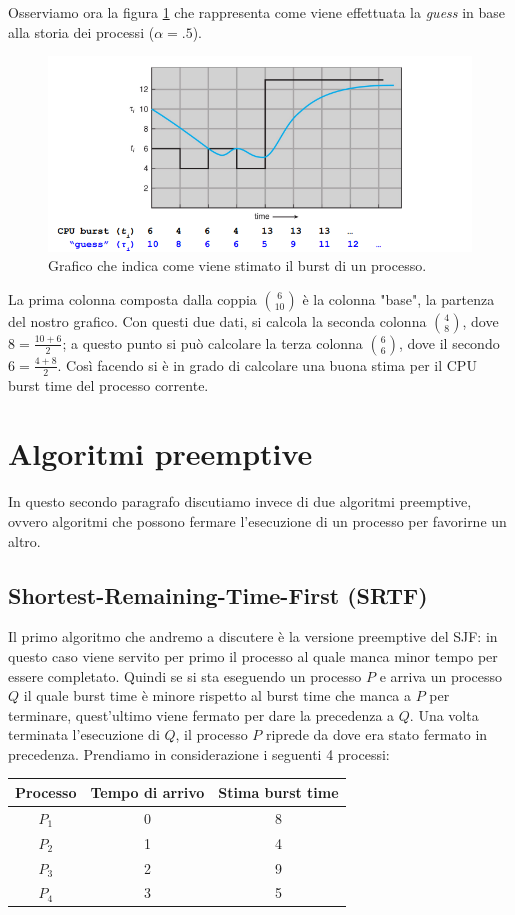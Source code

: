Osserviamo ora la figura \ref{fig:CPU burst estimation} che rappresenta come viene effettuata la \textit{guess} in base alla storia dei processi ($\alpha = .5$).
\begin{figure}[h]
    \centering
    \includegraphics[width = .75\textwidth]{../res/imgs/CPU scheduling/CPU_burst_estimation.png}
    \caption{Grafico che indica come viene stimato il burst di un processo.}
    \label{fig:CPU burst estimation}
\end{figure}
La prima colonna composta dalla coppia $\binom{6}{10}$ è la colonna "base", la partenza del nostro grafico. Con questi due dati, si calcola la seconda colonna $\binom{4}{8}$, dove $ 8 = \frac{10 + 6}{2}$; a questo punto si può calcolare la terza colonna $\binom{6}{6}$, dove il secondo $6 = \frac{4 + 8}{2}$. Così facendo si è in grado di calcolare una buona stima per il CPU burst time del processo corrente.

% 
\section{Algoritmi preemptive}
In questo secondo paragrafo discutiamo invece di due algoritmi preemptive, ovvero algoritmi che possono fermare l'esecuzione di un processo per favorirne un altro.

% 
\subsection{Shortest-Remaining-Time-First (SRTF)}
Il primo algoritmo che andremo a discutere è la versione preemptive del SJF: in questo caso viene servito per primo il processo al quale manca minor tempo per essere completato. Quindi se si sta eseguendo un processo $P$ e arriva un processo $Q$ il quale burst time è minore rispetto al burst time che manca a $P$ per terminare, quest'ultimo viene fermato per dare la precedenza a $Q$. Una volta terminata l'esecuzione di $Q$, il processo $P$ riprede da dove era stato fermato in precedenza. Prendiamo in considerazione i seguenti 4 processi:
\begin{table}[h]
    \centering
    \begin{tabular}{c c c}
        \textbf{Processo} & \textbf{Tempo di arrivo} & \textbf{Stima burst time} \\\hline
        $P_1$ & 0 & 8 \\
        $P_2$ & 1 & 4 \\
        $P_3$ & 2 & 9 \\
        $P_4$ & 3 & 5 \\\hline
    \end{tabular}
\end{table}

